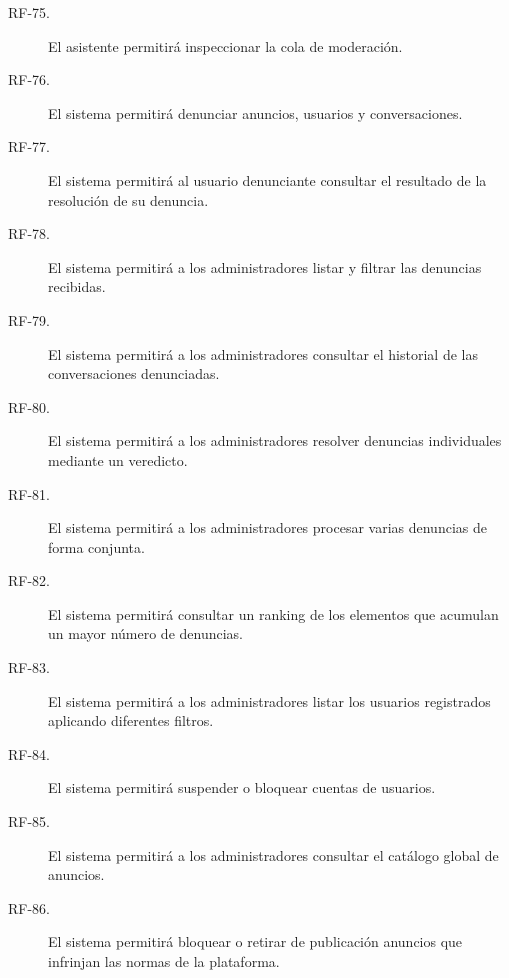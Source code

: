\begin{description}
    \item[RF-75.] El asistente permitirá inspeccionar la cola de moderación.

    \item[RF-76.] El sistema permitirá denunciar anuncios, usuarios y conversaciones.

    \item[RF-77.] El sistema permitirá al usuario denunciante consultar el resultado de la resolución de su denuncia.

    \item[RF-78.] El sistema permitirá a los administradores listar y filtrar las denuncias recibidas.

    \item[RF-79.] El sistema permitirá a los administradores consultar el historial de las conversaciones denunciadas.

    \item[RF-80.] El sistema permitirá a los administradores resolver denuncias individuales mediante un veredicto.

    \item[RF-81.] El sistema permitirá a los administradores procesar varias denuncias de forma conjunta.

    \item[RF-82.] El sistema permitirá consultar un ranking de los elementos que acumulan un mayor número de denuncias.

    \item[RF-83.] El sistema permitirá a los administradores listar los usuarios registrados aplicando diferentes filtros.

    \item[RF-84.] El sistema permitirá suspender o bloquear cuentas de usuarios.

    \item[RF-85.] El sistema permitirá a los administradores consultar el catálogo global de anuncios.

    \item[RF-86.] El sistema permitirá bloquear o retirar de publicación anuncios que infrinjan las normas de la plataforma.
\end{description}